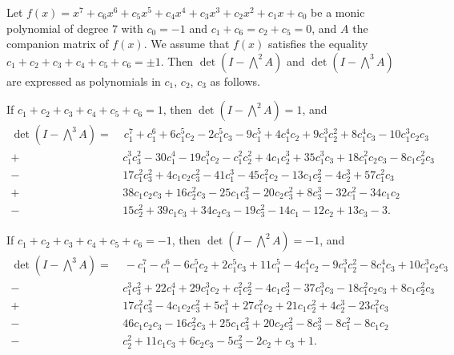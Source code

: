 \documentclass{amsart}
\theoremstyle{plain}
\theoremstyle{definition}
\theoremstyle{remark}
\begin{document}
\begin{small}

Let $f(x)=x^7+c_6x^6+c_5x^5+c_4x^4+c_3x^3+c_2x^2+c_1x+c_0$ be 
a monic polynomial of degree $7$ with $c_0=-1$ and $c_1+c_6=c_2+c_5=0$, and 
$A$ the companion matrix of $f(x)$. 
We assume that $f(x)$ satisfies the equality $c_1+c_2+c_3+c_4+c_5+c_6=\pm 1$. 
Then $\det(I-\bigwedge^2A)$ and 
$\det(I-\bigwedge^3A)$ are expressed as polynomials in $c_1$, $c_2$, $c_3$ as follows. 



If $c_1+c_2+c_3+c_4+c_5+c_6=1$, then $\det(I-\bigwedge^2A)=1$, and 
{\allowdisplaybreaks %
\begin{align*}
\det(I-\bigwedge^3A)
= & \; c_1^{7}+c_1^{6}+6c_1^{5}c_2-2c_1^{5}c_3-9c_1^{5}+4c_1^{4}c_2+9c_1^{3}c_2^{2}+8c_1^{4}c_3
     -10c_1^{3}c_2c_3 \\
     + & \, c_1^{3}c_3^{2}-30c_1^{4}-19c_1^{3}c_2-c_1^{2}c_2^{2}+4c_1c_2^{3}+35c_1
     ^{3}c_3+18c_1^{2}c_2c_3-8c_1c_2^{2}c_3 \\
     - & \, 17c_1^{2}c_3^{2}+4c_1c_2c_3^{2}-41c_1^{3}-45c_1^{2}c_2-13c_1c_2^{2}-4c_2^{3}+57c_1^{2}c_3 \\
     + & \, 38c_1c_2c_3+16c_2^{2}c_3-25c_1c_3^{2}-20c_2c_3^{2}+8c_3^{3}-32c_1^{2}-34c_1c_2 \\
      - & \, 15c_2^{2}+39c_1c_3+34c_2c_3-19c_3^{2}-14c_1-12c_2+13c_3-3. 
\end{align*}}
     

If $c_1+c_2+c_3+c_4+c_5+c_6=-1$, then $\det(I-\bigwedge^2A)=-1$, and 
{\allowdisplaybreaks %
\begin{align*}
\det(I-\bigwedge^3A)
= & \; -c_1^{7}-c_1^{6}-6c_1^{5}c_2+2c_1^{5}c_3+11c_1^{5}-4c_1^{4}c_2-9c_1^{3}c_2^{2}-8c_1^{4
     }c_3+10c_1^{3}c_2c_3 \\
     - & \, c_1^{3}c_3^{2}+22c_1^{4}+29c_1^{3}c_2+c_1^{2}c_2^{2}-4c_1c_2^{3}-37
     c_1^{3}c_3-18c_1^{2}c_2c_3+8c_1c_2^{2}c_3 \\
     + & \, 17c_1^{2}c_3^{2}-4c_1c_2c_3^{2}+5c_1^{3}+
     27c_1^{2}c_2+21c_1c_2^{2}+4c_2^{3}-23c_1^{2}c_3 \\
     - & \, 46c_1c_2c_3-16c_2^{2}c_3+25c_1c_3
     ^{2}+20c_2c_3^{2}-8c_3^{3}-8c_1^{2}-8c_1c_2 \\
     - & \, c_2^{2}+11c_1c_3+6c_2c_3-5c_3^{2}-2c_2+c_3+1. 
\end{align*}}
     
\end{small}
\end{document}

